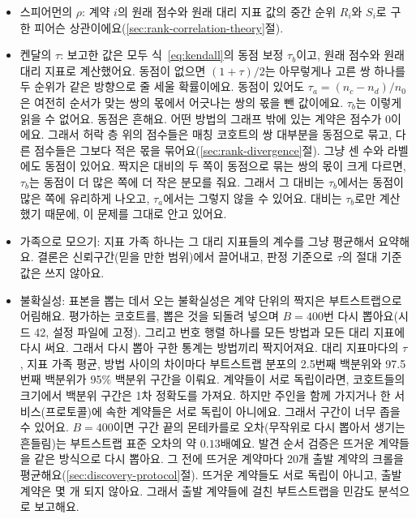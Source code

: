 \begin{itemize}
\item 스피어먼의 $\rho$: 계약 $i$의 원래 점수와 원래 대리 지표 값의 중간 순위 $R_i$와 $S_i$로 구한 피어슨 상관이에요(\ref{sec:rank-correlation-theory}절).

\item 켄달의 $\tau$: 보고한 값은 모두 식~\eqref{eq:kendall}의 동점 보정 $\tau_b$이고, 원래 점수와 원래 대리 지표로 계산했어요. 동점이 없으면 $(1+\tau)/2$는 아무렇게나 고른 쌍 하나를 두 순위가 같은 방향으로 줄 세울 확률이에요. 동점이 있어도 $\tau_a=(n_c-n_d)/n_0$은 여전히 순서가 맞는 쌍의 몫에서 어긋나는 쌍의 몫을 뺀 값이에요. $\tau_b$는 이렇게 읽을 수 없어요. 동점은 흔해요. 어떤 방법의 그래프 밖에 있는 계약은 점수가 0이에요. 그래서 허락 층 위의 점수들은 매칭 코호트의 쌍 대부분을 동점으로 묶고, 다른 점수들은 그보다 적은 몫을 묶어요(\ref{sec:rank-divergence}절). 그냥 센 수와 라벨에도 동점이 있어요. 짝지은 대비의 두 쪽이 동점으로 묶는 쌍의 몫이 크게 다르면, $\tau_b$는 동점이 더 많은 쪽에 더 작은 분모를 줘요. 그래서 그 대비는 $\tau_b$에서는 동점이 많은 쪽에 유리하게 나오고, $\tau_a$에서는 그렇지 않을 수 있어요. 대비는 $\tau_b$로만 계산했기 때문에, 이 문제를 그대로 안고 있어요.

\item 가족으로 모으기: 지표 가족 하나는 그 대리 지표들의 계수를 그냥 평균해서 요약해요. 결론은 신뢰구간(믿을 만한 범위)에서 끌어내고, 판정 기준으로 $\tau$의 절대 기준값은 쓰지 않아요.

\item 불확실성: 표본을 뽑는 데서 오는 불확실성은 계약 단위의 짝지은 부트스트랩으로 어림해요\parencite{efron1979bootstrap}. 평가하는 코호트를, 뽑은 것을 되돌려 넣으며 $B=400$번 다시 뽑아요(시드 42, 설정 파일에 고정). 그리고 번호 행렬 하나를 모든 방법과 모든 대리 지표에 다시 써요. 그래서 다시 뽑아 구한 통계는 방법끼리 짝지어져요. 대리 지표마다의 $\tau$, 지표 가족 평균, 방법 사이의 차이마다 부트스트랩 분포의 2.5번째 백분위와 97.5번째 백분위가 95\% 백분위 구간을 이뤄요\parencite{diciccio1996bootstrap}. 계약들이 서로 독립이라면, 코호트들의 크기에서 백분위 구간은 1차 정확도를 가져요. 하지만 주인을 함께 가지거나 한 서비스(프로토콜)에 속한 계약들은 서로 독립이 아니에요. 그래서 구간이 너무 좁을 수 있어요. $B=400$이면 구간 끝의 몬테카를로 오차(무작위로 다시 뽑아서 생기는 흔들림)는 부트스트랩 표준 오차의 약 $0.13$배예요. 발견 순서 검증은 뜨거운 계약들을 같은 방식으로 다시 뽑아요. 그 전에 뜨거운 계약마다 $20$개 출발 계약의 크롤을 평균해요(\ref{sec:discovery-protocol}절). 뜨거운 계약들도 서로 독립이 아니고, 출발 계약은 몇 개 되지 않아요. 그래서 출발 계약들에 걸친 부트스트랩을 민감도 분석으로 보고해요.


\end{itemize}
